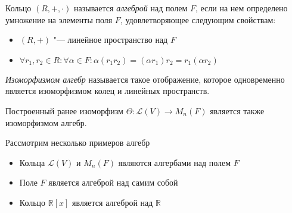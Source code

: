 \begin{definition}
	Кольцо $(R, +, \cdot)$ называется \textit{алгеброй} над полем $F$, если на нем определено умножение на элементы поля $F$, удовлетворяющее следующим свойствам:
	\begin{itemize}
		\item $(R, +)$ "--- линейное пространство над $F$
		\item $\forall r_1, r_2 \in R: \forall \alpha \in F: \alpha (r_1r_2) = (\alpha r_1)r_2 = r_1 (\alpha r_2)$
	\end{itemize}
\end{definition}

\begin{definition}
	\textit{Изоморфизмом алгебр} называется такое отображение, которое одновременно является изоморфизмом колец и линейных пространств.
\end{definition}

\begin{note}
	Построенный ранее изоморфизм $\Theta: \mathcal{L}(V) \rightarrow M_n(F)$ является также изоморфизмом алгебр.
\end{note}

\begin{example}
	Рассмотрим несколько примеров алгебр
	\begin{itemize}
		\item Кольца $\mathcal{L}(V)$ и $M_n(F)$ являются алгербами над полем $F$
		\item Поле $F$ является алгеброй над самим собой
		\item Кольцо $\mathbb{R}[x]$ является алгеброй над $\mathbb{R}$
	\end{itemize}
\end{example}